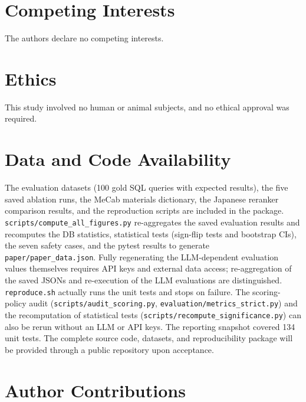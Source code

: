 \section*{Competing Interests}

The authors declare no competing interests.

\section*{Ethics}

This study involved no human or animal subjects, and no ethical approval was required.

\section*{Data and Code Availability}

The evaluation datasets (100 gold SQL queries with expected results), the five saved ablation runs, the MeCab materials dictionary, the Japanese reranker comparison results, and the reproduction scripts are included in the package. \texttt{scripts/compute\_all\_figures.py} re-aggregates the saved evaluation results and recomputes the DB statistics, statistical tests (sign-flip tests and bootstrap CIs), the seven safety cases, and the pytest results to generate \texttt{paper/paper\_data.json}. Fully regenerating the LLM-dependent evaluation values themselves requires API keys and external data access; re-aggregation of the saved JSONs and re-execution of the LLM evaluations are distinguished. \texttt{reproduce.sh} actually runs the unit tests and stops on failure. The scoring-policy audit (\texttt{scripts/audit\_scoring.py}, \texttt{evaluation/metrics\_strict.py}) and the recomputation of statistical tests (\texttt{scripts/recompute\_significance.py}) can also be rerun without an LLM or API keys. The reporting snapshot covered 134 unit tests. The complete source code, datasets, and reproducibility package will be provided through a public repository upon acceptance.

\section*{Author Contributions}

